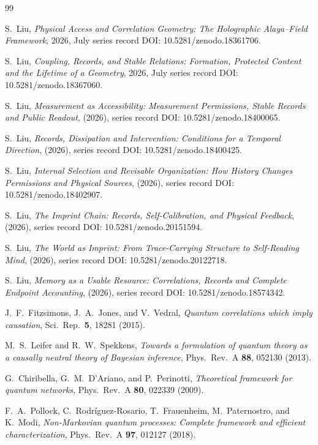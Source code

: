\documentclass[11pt,a4paper]{article}
\begin{document}
\begin{thebibliography}{99}

S.~Liu, \emph{Physical Access and Correlation Geometry: The Holographic
Alaya--Field Framework}, 2026, July series
record DOI: 10.5281/zenodo.18361706.

S.~Liu, \emph{Coupling, Records, and Stable Relations:
Formation, Protected Content and the Lifetime of a Geometry},
2026, July series record DOI:
10.5281/zenodo.18367060.

S.~Liu, \emph{Measurement as Accessibility: Measurement Permissions, Stable Records and Public Readout}, (2026), series record DOI: 10.5281/zenodo.18400065.

S.~Liu, \emph{Records, Dissipation and Intervention: Conditions for a Temporal Direction}, (2026), series record DOI: 10.5281/zenodo.18400425.

S.~Liu, \emph{Internal Selection and Revisable Organization: How History Changes Permissions and Physical Sources}, (2026), series record DOI: 10.5281/zenodo.18402907.

S.~Liu, \emph{The Imprint Chain: Records, Self-Calibration, and Physical Feedback}, (2026), series record DOI: 10.5281/zenodo.20151594.

S.~Liu, \emph{The World as Imprint: From Trace-Carrying Structure to Self-Reading Mind}, (2026), series record DOI: 10.5281/zenodo.20122718.

S.~Liu, \emph{Memory as a Usable Resource: Correlations, Records and Complete Endpoint Accounting}, (2026), series record DOI: 10.5281/zenodo.18574342.

J.~F.~Fitzsimons, J.~A.~Jones, and V.~Vedral, \emph{Quantum correlations which imply causation}, Sci.\ Rep.\ \textbf{5}, 18281 (2015).

M.~S.~Leifer and R.~W.~Spekkens, \emph{Towards a formulation of quantum theory as a causally neutral theory of Bayesian inference}, Phys.\ Rev.\ A \textbf{88}, 052130 (2013).

G.~Chiribella, G.~M.~D'Ariano, and P.~Perinotti, \emph{Theoretical framework for quantum networks}, Phys.\ Rev.\ A \textbf{80}, 022339 (2009).

F.~A.~Pollock, C.~Rodr\'iguez-Rosario, T.~Frauenheim, M.~Paternostro, and K.~Modi, \emph{Non-Markovian quantum processes: Complete framework and efficient characterization}, Phys.\ Rev.\ A \textbf{97}, 012127 (2018).


\end{thebibliography}
\end{document}
